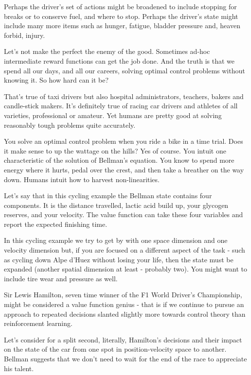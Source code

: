 Perhaps the driver's set of actions might be broadened to include stopping for breaks or to conserve fuel, and where to stop. Perhaps the driver's state might include many more items such as hunger, fatigue, bladder pressure and, heaven forbid, injury.
  
Let's not make the perfect the enemy of the good. Sometimes ad-hoc intermediate reward functions can get the job done. And the truth is that we spend all our days, and all our careers, solving optimal control problems without knowing it. So how hard can it be?


That's true of taxi drivers but also hospital administrators, teachers, bakers and candle-stick makers. It's definitely true of racing car drivers and athletes of all varieties, professional or amateur. Yet humans are pretty good at solving reasonably tough problems quite accurately. 


You solve an optimal control problem when you ride a bike in a time trial. Does it make sense to up the wattage on the hills? Yes of course. You intuit one characteristic of the solution of Bellman's equation. You know to spend more energy where it hurts, pedal over the crest, and then take a breather on the way down. Humans intuit how to harvest non-linearities. 

Let's say that in this cycling example the Bellman state contains four components. It is the distance travelled, lactic acid build up, your glycogen reserves, and your velocity. The value function can take these four variables and report the expected finishing time. 

In this cycling example we try to get by with one space dimension and one velocity dimension but, if you are focused on a different aspect of the task - such as cycling down Alpe d'Huez without losing your life, then the state must be expanded (another spatial dimension at least - probably two). You might want to include tire wear and pressure as well.

Sir Lewis Hamilton, seven time winner of the F1 World Driver's Championship, might be considered a value function genius - that is if we continue to pursue an approach to repeated decisions slanted slightly more towards control theory than reinforcement learning. 

Let's consider for a split second, literally, Hamilton's decisions and their impact on the state of the car from one spot in position-velocity space to another. Bellman suggests that we don't need to wait for the end of the race to appreciate his talent. 

